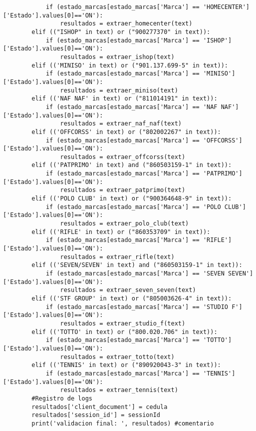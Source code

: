 \documentclass{article}
\begin{document}
\begin{lstlisting}
            if (estado_marcas[estado_marcas['Marca'] == 'HOMECENTER']['Estado'].values[0]=='ON'):
                resultados = extraer_homecenter(text)
        elif (("ISHOP" in text) or ("900277370" in text)):
            if (estado_marcas[estado_marcas['Marca'] == 'ISHOP']['Estado'].values[0]=='ON'):
                resultados = extraer_ishop(text)
        elif (('MINISO' in text) or ("901.137.699-5" in text)):
            if (estado_marcas[estado_marcas['Marca'] == 'MINISO']['Estado'].values[0]=='ON'):
                resultados = extraer_miniso(text)
        elif (('NAF NAF' in text) or ("811014191" in text)):
            if (estado_marcas[estado_marcas['Marca'] == 'NAF NAF']['Estado'].values[0]=='ON'):
                resultados = extraer_naf_naf(text)
        elif (('OFFCORSS' in text) or ("802002267" in text)):
            if (estado_marcas[estado_marcas['Marca'] == 'OFFCORSS']['Estado'].values[0]=='ON'):
                resultados = extraer_offcorss(text)
        elif (('PATPRIMO' in text) and ("860503159-1" in text)):
            if (estado_marcas[estado_marcas['Marca'] == 'PATPRIMO']['Estado'].values[0]=='ON'):
                resultados = extraer_patprimo(text)
        elif (('POLO CLUB' in text) or ("900364648-9" in text)):
            if (estado_marcas[estado_marcas['Marca'] == 'POLO CLUB']['Estado'].values[0]=='ON'):
                resultados = extraer_polo_club(text)
        elif (('RIFLE' in text) or ("860353709" in text)):
            if (estado_marcas[estado_marcas['Marca'] == 'RIFLE']['Estado'].values[0]=='ON'):
                resultados = extraer_rifle(text)
        elif (('SEVEN/SEVEN' in text) and ("860503159-1" in text)):
            if (estado_marcas[estado_marcas['Marca'] == 'SEVEN SEVEN']['Estado'].values[0]=='ON'):
                resultados = extraer_seven_seven(text)
        elif (('STF GROUP' in text) or ("805003626-4" in text)):
            if (estado_marcas[estado_marcas['Marca'] == 'STUDIO F']['Estado'].values[0]=='ON'):
                resultados = extraer_studio_f(text)
        elif (('TOTTO' in text) or ("800.020.706" in text)):
            if (estado_marcas[estado_marcas['Marca'] == 'TOTTO']['Estado'].values[0]=='ON'):
                resultados = extraer_totto(text)
        elif (('TENNIS' in text) or ("890920043-3" in text)):
            if (estado_marcas[estado_marcas['Marca'] == 'TENNIS']['Estado'].values[0]=='ON'):
                resultados = extraer_tennis(text)     
        #Registro de logs
        resultados['client_document'] = cedula
        resultados['session_id'] = sessionId
        print('validacion final: ', resultados) #comentario

\end{lstlisting}
\end{document}
